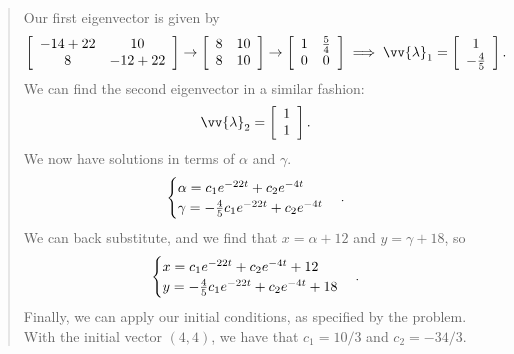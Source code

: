 \documentclass{hw}
\begin{document}
\begin{enumerate}
\begin{quote}
Our first eigenvector is given by
\[
\left[
\begin{array}{c c}
-14+22 & 10\\
8 & -12+22
\end{array}
\right]
\to
\left[
\begin{array}{c c}
8 & 10\\
8 & 10
\end{array}
\right]
\to
\left[
\begin{array}{c c}
1 & {5\over 4}\\
0 & 0
\end{array}
\right]
\implies
\vv{\lambda}_{1} =
\left[
\begin{array}{c}
1\\
-{4\over5}
\end{array}
\right].
\]
We can find the second eigenvector in a similar fashion:
\[
\vv{\lambda}_{2} =
\left[
\begin{array}{c}
1\\
1
\end{array}
\right].
\]
We now have solutions in terms of $\alpha$ and $\gamma$.
\[
\begin{cases}
\alpha = c_{1}e^{-22t}+c_{2}e^{-4t}\\
\gamma = -{4\over5}c_{1}e^{-22t} + c_{2}e^{-4t}
\end{cases}.
\]
We can back substitute, and we find that $x = \alpha + 12$ and $y = \gamma + 18$, so
\[
\begin{cases}
x = c_{1}e^{-22t}+c_{2}e^{-4t} + 12\\
y = -{4\over5}c_{1}e^{-22t} + c_{2}e^{-4t}+18
\end{cases}.
\]
Finally, we can apply our initial conditions, as specified by the problem. With the initial vector
$(4,4)$, we have that $c_{1} = 10/3$ and $c_{2} = -34/3$.
\end{quote}
\end{enumerate}
\end{document}

